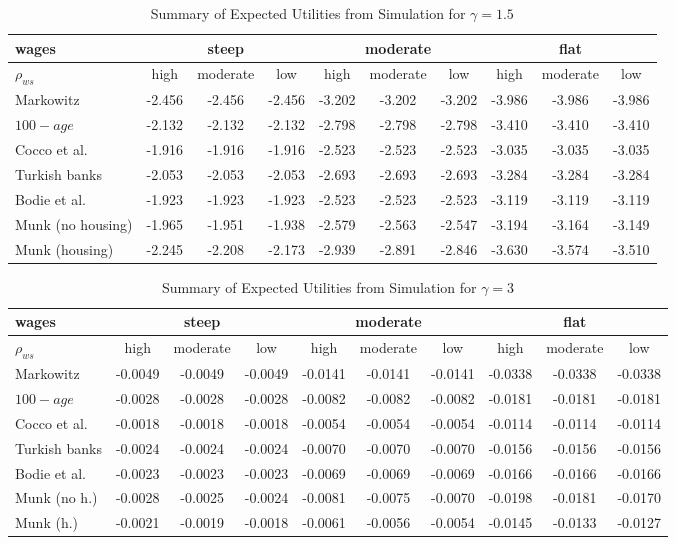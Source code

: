 \begin{table}[h!]
	\scriptsize
	\centering
	\caption{Summary of Expected Utilities from Simulation for $\gamma=1.5$}
	\label{table:utila}
	\begin{tabular}[c]{|l|ccc|ccc|ccc|}
		\hline
		 wages& \multicolumn{3}{c|}{steep} & \multicolumn{3}{c|}{moderate} & \multicolumn{3}{c|}{flat}\\
		\hline
		$\rho_{ws}$&high&moderate&low&high&moderate&low&high&moderate&low\\
		\hline
Markowitz				&-2.456&-2.456&-2.456&-3.202&-3.202&-3.202&-3.986&-3.986&-3.986	\\
$100-age$				&-2.132&-2.132&-2.132&-2.798&-2.798&-2.798&-3.410&-3.410&-3.410	\\
Cocco et al.			&-1.916&-1.916&-1.916&-2.523&-2.523&-2.523&-3.035&-3.035&-3.035	\\
Turkish banks			&-2.053&-2.053&-2.053&-2.693&-2.693&-2.693&-3.284&-3.284&-3.284 \\
Bodie et al.			&-1.923&-1.923&-1.923&-2.523&-2.523&-2.523&-3.119&-3.119&-3.119 \\
Munk (no housing)		&-1.965&-1.951&-1.938&-2.579&-2.563&-2.547&-3.194&-3.164&-3.149	\\
Munk (housing)			&-2.245&-2.208&-2.173&-2.939&-2.891&-2.846&-3.630&-3.574&-3.510	\\
	\hline
	\end{tabular}
\end{table}
\begin{table}[h!]
	\scriptsize
	\centering
	\caption{Summary of Expected Utilities from Simulation for $\gamma=3$}
	\label{table:utilb}
	\begin{tabular}[c]{|l|ccc|ccc|ccc|}
		\hline
		 wages& \multicolumn{3}{c|}{steep} & \multicolumn{3}{c|}{moderate} & \multicolumn{3}{c|}{flat}\\
		\hline
		$\rho_{ws}$&high&moderate&low&high&moderate&low&high&moderate&low\\
		\hline
Markowitz					&-0.0049&-0.0049&-0.0049&-0.0141&-0.0141&-0.0141&-0.0338&-0.0338&-0.0338\\
$100-age$					&-0.0028&-0.0028&-0.0028&-0.0082&-0.0082&-0.0082&-0.0181&-0.0181&-0.0181\\
Cocco et al.				&-0.0018&-0.0018&-0.0018&-0.0054&-0.0054&-0.0054&-0.0114&-0.0114&-0.0114\\
Turkish banks			 	&-0.0024&-0.0024&-0.0024&-0.0070&-0.0070&-0.0070&-0.0156&-0.0156&-0.0156\\
Bodie et al.			 	&-0.0023&-0.0023&-0.0023&-0.0069&-0.0069&-0.0069&-0.0166&-0.0166&-0.0166\\
Munk (no h.)				&-0.0028&-0.0025&-0.0024&-0.0081&-0.0075&-0.0070&-0.0198&-0.0181&-0.0170\\
Munk (h.)					&-0.0021&-0.0019&-0.0018&-0.0061&-0.0056&-0.0054&-0.0145&-0.0133&-0.0127\\
	\hline
	\end{tabular}
\end{table}
